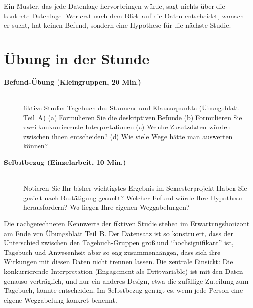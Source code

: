 \begin{merkbox}
Ein Muster, das jede Datenlage hervorbringen würde, sagt nichts über die
konkrete Datenlage. Wer erst nach dem Blick auf die Daten entscheidet,
wonach er sucht, hat keinen Befund, sondern eine Hypothese für die
nächste Studie.
\end{merkbox}
\os{\newpage}

\section{Übung in der Stunde}
\begin{description}
\item[{\rot\bf Befund-Übung (Kleingruppen, 20 Min.)}]~\\[-\lblskip]
\bi
  \ite fiktive Studie: Tagebuch des Staunens und Klausurpunkte
    (Übungsblatt Teil~A)
  \ite (a) Formulieren Sie die deskriptiven Befunde
  \ite (b) Formulieren Sie zwei konkurrierende Interpretationen
  \ite (c) Welche Zusatzdaten würden zwischen ihnen entscheiden?
  \ite (d) Wie viele Wege hätte man auswerten können?
\ei
\os{\newpage}

\item[{\rot\bf Selbstbezug (Einzelarbeit, 10 Min.)}]~\\[-\lblskip]
\bi
  \ite Notieren Sie Ihr bisher wichtigstes Ergebnis im Semesterprojekt
  \ite Haben Sie gezielt nach Bestätigung gesucht?
  \ite Welcher Befund würde Ihre Hypothese herausfordern?
  \ite Wo liegen Ihre eigenen Weggabelungen?
\ei
\os{\newpage}
\end{description}

\begin{lehrhinweis}
Die nachgerechneten Kennwerte der fiktiven Studie stehen im
Erwartungshorizont am Ende von Übungsblatt Teil~B. Der Datensatz ist so konstruiert,
dass der Unterschied zwischen den Tagebuch-Gruppen groß und
\enquote{hochsignifikant} ist, Tagebuch und Anwesenheit aber so eng
zusammenhängen, dass sich ihre Wirkungen mit diesen Daten nicht trennen
lassen. Die zentrale Einsicht: Die konkurrierende Interpretation
(Engagement als Drittvariable) ist mit den Daten genauso verträglich, und
nur ein anderes Design, etwa die zufällige Zuteilung zum Tagebuch,
könnte entscheiden. Im Selbstbezug genügt es, wenn jede Person eine
eigene Weggabelung konkret benennt.
\end{lehrhinweis}

